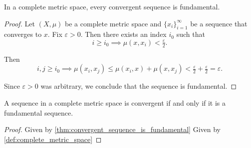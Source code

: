 \begin{proposition}\label{thm:convergent_sequence_is_fundamental}
  In a complete metric space, every convergent sequence is fundamental.
\end{proposition}
\begin{proof}
  Let \( (X, \mu) \) be a complete metric space and \( \{ x_i \}_{i=1}^\infty \) be a sequence that converges to \( x \). Fix \( \varepsilon > 0 \). Then there exists an index \( i_0 \) such that
  \begin{equation*}
    i \geq i_0 \implies \mu(x, x_i) < \tfrac \varepsilon 2.
  \end{equation*}

  Then
  \begin{equation*}
    i, j \geq i_0 \implies \mu(x_i, x_j) \leq \mu(x_i, x) + \mu(x, x_j) < \tfrac \varepsilon 2 + \tfrac \varepsilon 2 = \varepsilon.
  \end{equation*}

  Since \( \varepsilon > 0 \) was arbitrary, we conclude that the sequence is fundamental.
\end{proof}

\begin{corollary}\label{thm:cauchy_convergence_criterion}
  A sequence in a complete metric space is convergent if and only if it is a fundamental sequence.
\end{corollary}
\begin{proof}
  \Implies Given by \cref{thm:convergent_sequence_is_fundamental}
  \ImpliedBy Given by \cref{def:complete_metric_space}
\end{proof}

